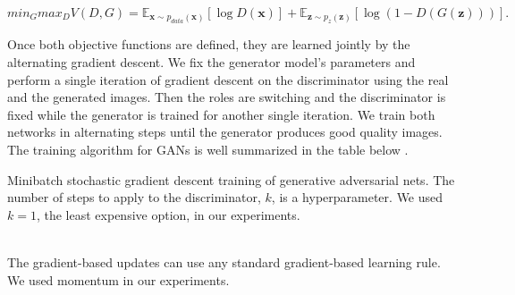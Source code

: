 \documentclass[12pt,a4paper,openany]{book}
\begin{document}
\begin{equation}
min_{G} max_{D} V(D, G) =  \mathbb{E}_{\textbf{x} \sim p_{data}(\textbf{x})} [\log D(\textbf{x})] + \mathbb{E}_{\textbf{z} \sim p_{z}(\textbf{z})} [\log(1-D(G(\textbf{z})))].
\end{equation}

\noindent Once both objective functions are defined, they are learned jointly by the alternating gradient descent. We fix the generator model’s parameters and perform a single iteration of gradient descent on the discriminator using the real and the generated images. Then the roles are switching and the discriminator is fixed while the generator is trained for another single iteration. We train both networks in alternating steps until the generator produces good quality images. The training algorithm for GANs is well summarized in the table below  \cite{gan}.

\begin{algorithm}[H]
\caption{\small Minibatch stochastic gradient descent training of generative adversarial nets.
The number of steps to apply to the discriminator, $k$, is a hyperparameter. We used $k=1$, the
least expensive option, in our experiments.
}
\begin{algorithmic}
\label{alg:AGF}
   \ENDFOR
  \ENDFOR
  \\The gradient-based updates can use any standard gradient-based learning rule. We used momentum in our experiments.
\end{algorithmic}
\end{algorithm}
\end{document}
